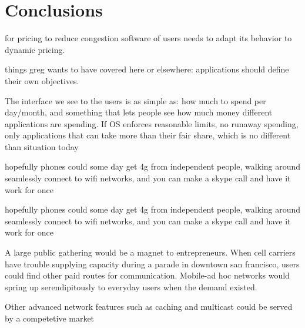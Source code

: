 \section{Conclusions}
for pricing to reduce congestion software of users needs to adapt its behavior to dynamic pricing.

things greg wants to have covered here or elsewhere:
applications should define their own objectives.

The interface we see to the users is as simple as: how much to spend per day/month, and something that lets people see how much money different applications are spending. If OS enforces reasonable limits, no runaway spending, only applications that can take more than their fair share, which is no different than situation today

hopefully phones could some day get 4g from independent people, walking around seamlessly connect to wifi networks, and you can make a skype call and have it work for once

hopefully phones could some day get 4g from independent people, walking around seamlessly connect to wifi networks, and you can make a skype call and have it work for once

A large public gathering would be a magnet to entrepreneurs. When cell carriers have trouble supplying capacity during a parade in downtown san francisco, users could find other paid routes for communication. Mobile-ad hoc networks would spring up serendipitously to everyday users when the demand existed.

Other advanced network features such as caching and multicast could be served by a competetive market
\label{sec:conc}
